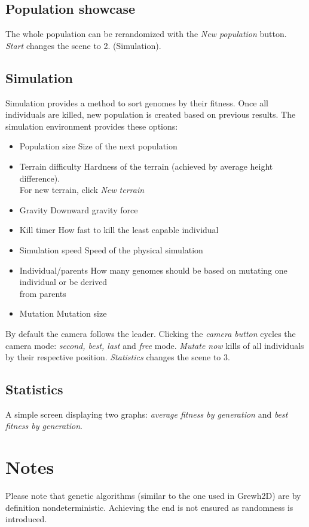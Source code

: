 \documentclass[a4paper]{article}
\begin{document}
\subsection*{Population showcase}
The whole population can be rerandomized with the \textit{New population} button. \textit{Start} changes the scene to 2. (Simulation).

\subsection*{Simulation}
Simulation provides a method to sort genomes by their fitness. Once all individuals are killed, new population is created based on previous results. The simulation environment provides these options:
\begin{itemize}
	\item{Population size} \hspace{0.92cm} Size of the next population
	\item{Terrain difficulty} \hspace{0.67cm}  Hardness of the terrain (achieved by average height difference).\\ 
	\text{}\hspace{3.39cm}  For new terrain, click \textit{New terrain}
	\item{Gravity} \hspace{2.1cm} Downward gravity force
	\item{Kill timer} \hspace{1.8cm} How fast to kill the least capable individual
	\item{Simulation speed} \hspace{0.71cm} Speed of the physical simulation
	\item{Individual/parents} \hspace{0.39cm} How many genomes should be based on mutating one individual or be derived \\
	\text{}\hspace{3.39cm} from parents
	\item{Mutation} \hspace{1.8cm} Mutation size
\end{itemize}
By default the camera follows the leader. Clicking the \textit{camera button} cycles the camera mode: \textit{second, best, last} and \textit{free} mode. \textit{Mutate now} kills of all individuals by their respective position. \textit{Statistics} changes the scene to 3.

\subsection*{Statistics}
A simple screen displaying two graphs: \textit{average fitness by generation} and \textit{best fitness by generation}.

\section*{Notes}
Please note that genetic algorithms (similar to the one used in Grewh2D) are by definition nondeterministic. Achieving the end is not ensured as randomness is introduced.
\end{document}
